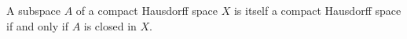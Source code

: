 A subspace $A$ of a compact Hausdorff space $X$ is itself a compact Hausdorff space if and only if $A$ is closed in $X$.
